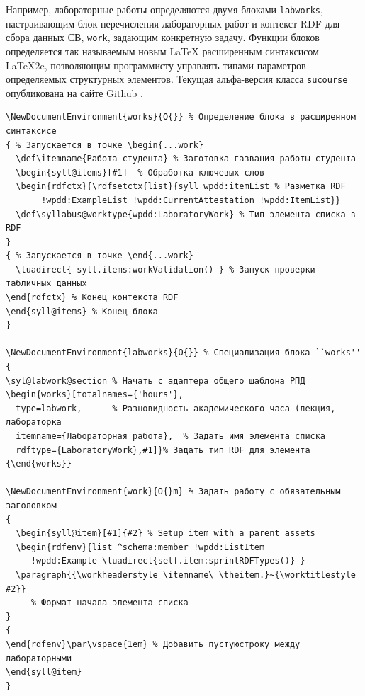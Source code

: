 \documentclass[
]{aiitart}
\begin{document}
Например, лабораторные работы определяются двумя блоками \verb|labworks|, настраивающим блок перечисления лабораторных работ и контекст RDF для сбора данных СВ, \verb|work|, задающим конкретную задачу. Функции блоков определяется так называемым новым \LaTeX{} расширенным синтаксисом \LaTeX2e, позволяющим программисту управлять типами параметров определяемых структурных элементов. Текущая альфа-версия класса \verb|sucourse| опубликована на сайте Github \cite{ghs}.

\begin{verbatim}
\NewDocumentEnvironment{works}{O{}} % Определение блока в расширенном синтаксисе
{ % Запускается в точке \begin{...work}
  \def\itemname{Работа студента} % Заготовка газвания работы студента
  \begin{syll@items}[#1]  % Обработка ключевых слов
  \begin{rdfctx}{\rdfsetctx{list}{syll wpdd:itemList % Разметка RDF
       !wpdd:ExampleList !wpdd:CurrentAttestation !wpdd:ItemList}}
  \def\syllabus@worktype{wpdd:LaboratoryWork} % Тип элемента списка в RDF
}
{ % Запускается в точке \end{...work}
  \luadirect{ syll.items:workValidation() } % Запуск проверки табличных данных
\end{rdfctx} % Конец контекста RDF
\end{syll@items} % Конец блока
}

\NewDocumentEnvironment{labworks}{O{}} % Специализация блока ``works''
{
\syl@labwork@section % Начать с адаптера общего шаблона РПД
\begin{works}[totalnames={'hours'},
  type=labwork,      % Разновидность академического часа (лекция, лабораторка
  itemname={Лабораторная работа},  % Задать имя элемента списка
  rdftype={LaboratoryWork},#1]}% Задать тип RDF для элемента
{\end{works}}

\NewDocumentEnvironment{work}{O{}m} % Задать работу с обязательным заголовком
{
  \begin{syll@item}[#1]{#2} % Setup item with a parent assets
  \begin{rdfenv}{list ^schema:member !wpdd:ListItem
     !wpdd:Example \luadirect{self.item:sprintRDFTypes()} }
  \paragraph{{\workheaderstyle \itemname\ \theitem.}~{\worktitlestyle #2}}
     % Формат начала элемента списка
}
{
\end{rdfenv}\par\vspace{1em} % Добавить пустуюстроку между лабораторными
\end{syll@item}
}
\end{verbatim}
\end{document}

